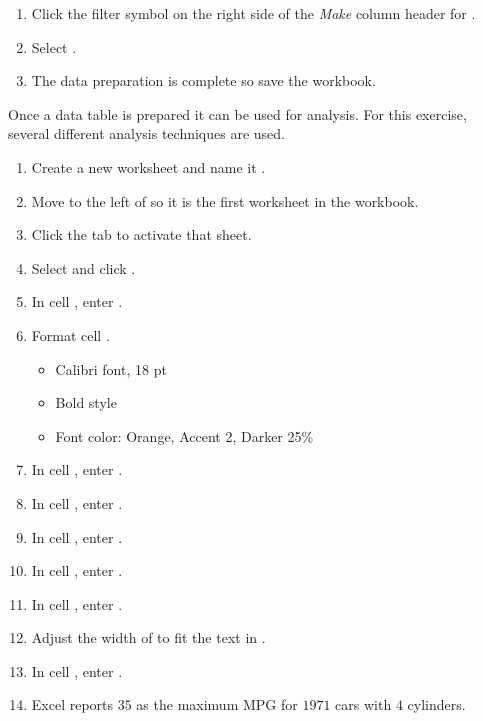 \begin{enumerate}[resume]
\begin{enumerate}
	\end{enumerate}

	\item Click the filter symbol on the right side of the \textit{Make} column header for .
	\item Select .
	\item The data preparation is complete so save the  workbook.

\end{enumerate}

Once a data table is prepared it can be used for analysis. For this exercise, several different analysis techniques are used.


\begin{enumerate}
	\item Create a new worksheet and name it .
	\item Move  to the left of  so it is the first worksheet in the workbook.
	\item Click the  tab to activate that sheet.
	\item Select  and click .
	\item In cell , enter .
	\item Format cell .
	
	\begin{itemize}
		\item Calibri font, 18 pt
		\item Bold style
		\item Font color: Orange, Accent 2, Darker 25\%
	\end{itemize}
	
	\item In cell , enter .
	\item In cell , enter .
	\item In cell , enter .
	\item In cell , enter .
	
	\item In cell , enter .
	\item Adjust the width of  to fit the text in .
	\item In cell , enter .
	\item Excel reports $ 35 $ as the maximum MPG for $ 1971 $ cars with $ 4 $ cylinders.
	

\end{enumerate}
